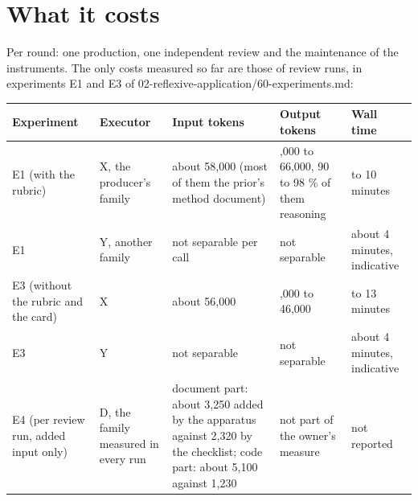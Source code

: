 \documentclass[
  american,
  10pt,
]{report}
\newcounter{none} %
\renewcommand{\texttt}[1]{{\ttfamily\hyphenchar\font=-1 #1}}
\begin{document}
\section{What it costs}\label{what-it-costs}

Per round: one production, one independent review and the maintenance of
the instruments. The only costs measured so far are those of review
runs, in experiments E1 and E3 of
\texttt{02-\allowbreak{}reflexive-\allowbreak{}application/\allowbreak{}60-\allowbreak{}experiments.\allowbreak{}md}:

{\def\LTcaptype{none} %
\begin{longtable}[]{@{}
  >{\raggedright\arraybackslash}p{}
  >{\raggedright\arraybackslash}p{}
  >{\raggedright\arraybackslash}p{}
  >{\raggedright\arraybackslash}p{}
  >{\raggedright\arraybackslash}p{}@{}}
\toprule\noalign{}
\begin{minipage}[b]{\linewidth}\raggedright
Experiment
\end{minipage} & \begin{minipage}[b]{\linewidth}\raggedright
Executor
\end{minipage} & \begin{minipage}[b]{\linewidth}\raggedright
Input tokens
\end{minipage} & \begin{minipage}[b]{\linewidth}\raggedright
Output tokens
\end{minipage} & \begin{minipage}[b]{\linewidth}\raggedright
Wall time
\end{minipage} \\
\midrule\noalign{}
\endhead
\bottomrule\noalign{}
\endlastfoot
E1 (with the rubric) & X, the producer's family & about 58,000 (most of
them the prior's method document) & 55,000 to 66,000, 90 to 98 \% of
them reasoning & 8 to 10 minutes \\
E1 & Y, another family & not separable per call & not separable & about
4 minutes, indicative \\
E3 (without the rubric and the card) & X & about 56,000 & 41,000 to
46,000 & 10 to 13 minutes \\
E3 & Y & not separable & not separable & about 4 minutes, indicative \\
E4 (per review run, added input only) & D, the family measured in every
run & document part: about 3,250 added by the apparatus against 2,320 by
the checklist; code part: about 5,100 against 1,230 & not part of the
owner's measure & not reported \\
\end{longtable}
}
\end{document}
